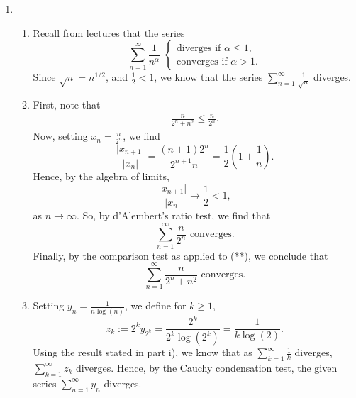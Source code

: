 \documentclass[
  12pt,
  a4paper]{extarticle}
\providecommand{\tightlist}{%
  \setlength{\itemsep}{0pt}\setlength{\parskip}{0pt}}
\theoremstyle{plain}
\theoremstyle{definition}
\theoremstyle{plain}
\theoremstyle{plain}
\theoremstyle{plain}
\theoremstyle{plain}
\theoremstyle{definition}
\theoremstyle{definition}
\theoremstyle{remark}
\theoremstyle{remark}
\renewcommand{\;}{\,}
\begin{document}
\begin{enumerate}
\begin{enumerate}
  \end{enumerate}
\item
  \begin{enumerate}
  \def\labelenumii{\roman{enumii})}
  \tightlist
  \item
    Recall from lectures that the series \[\sum_{n=1}^{\infty} \frac{1}{n^{\alpha}}\;\;\begin{cases}\text{diverges if}\;\; \alpha \leq 1,\\
    \text{converges if}\;\; \alpha > 1.
    \end{cases}\] Since \(\sqrt{n} = n^{1/2}\), and \(\frac{1}{2}<1\), we know that the series \(\sum_{n=1}^{\infty}\frac{1}{\sqrt{n}}\) diverges.
  \item
    First, note that
    \begin{align}
    \frac{n}{2^n + n^2} \leq \frac{n}{2^n}.\tag{**}
    \end{align}
    Now, setting \(x_n = \frac{n}{2^n}\), we find \[\frac{\lvert x_{n+1}\rvert}{\lvert x_n \rvert} = \frac{(n+1)2^n}{2^{n+1}n} = \frac{1}{2}\left(1 + \frac{1}{n}\right).\] Hence, by the algebra of limits, \[\frac{\lvert x_{n+1}\rvert}{\lvert x_n \rvert} \to \frac{1}{2} < 1,\] as \(n \to \infty\). So, by d'Alembert's ratio test, we find that \[\sum_{n=1}^{\infty}\frac{n}{2^n} \; \; \text{converges.}\] Finally, by the comparison test as applied to (**), we conclude that \[\sum_{n=1}^{\infty}\frac{n}{2^n + n^2} \; \; \text{converges.}\]
  \item
    Setting \(y_n = \frac{1}{n\log(n)}\), we define for \(k \geq 1,\) \[z_{k}:= 2^k y_{2^k} = \frac{2^k}{2^k\log(2^k)} = \frac{1}{k\log(2)}.\] Using the result stated in part i), we know that as \(\sum_{k=1}^{\infty}\frac{1}{k}\) diverges, \(\sum_{k=1}^{\infty} z_k\) diverges. Hence, by the Cauchy condensation test, the given series \(\sum_{n=1}^{\infty}y_n\) diverges.
  \end{enumerate}
\end{enumerate}
\end{document}
